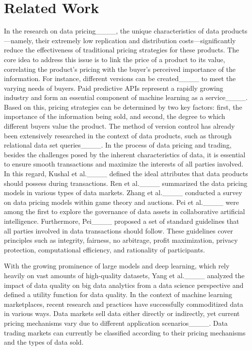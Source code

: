 \section{Related Work}
\label{sec:related}
In the research on data pricing____, the unique characteristics of data products—namely, their extremely low replication and distribution costs—significantly reduce the effectiveness of traditional pricing strategies for these products. The core idea to address this issue is to link the price of a product to its value, correlating the product's pricing with the buyer's perceived importance of the information. For instance, different versions can be created____ to meet the varying needs of buyers. Paid predictive APIs represent a rapidly growing industry and form an essential component of machine learning as a service____. Based on this, pricing strategies can be determined by two key factors: first, the importance of the information being sold, and second, the degree to which different buyers value the product. The method of version control has already been extensively researched in the context of data products, such as through relational data set queries____. In the process of data pricing and trading, besides the challenges posed by the inherent characteristics of data, it is essential to ensure smooth transactions and maximize the interests of all parties involved. In this regard, Kushal et al.____ defined the ideal attributes that data products should possess during transactions. Ren et al.____ summarized the data pricing models in various types of data markets. Zhang et al.____ conducted a survey on data pricing models within game theory and auctions. Pei et al.____ were among the first to explore the governance of data assets in collaborative artificial intelligence. Furthermore, Pei____ proposed a set of standard guidelines that all parties involved in data transactions should follow. These guidelines cover principles such as integrity, fairness, no arbitrage, profit maximization, privacy protection, computational efficiency, and rationality of participants.

With the growing prominence of large models and deep learning, which rely heavily on vast amounts of high-quality datasets, Yang et al.____ analyzed the impact of data quality on big data analytics from a data science perspective and defined a utility function for data quality. In the context of machine learning marketplaces, recent research and practices have successfully commoditized data in various ways. Data markets sell data either directly or indirectly, yet current pricing mechanisms vary due to different application scenarios____. Data trading markets can currently be classified according to their pricing mechanisms and the types of data sold.

